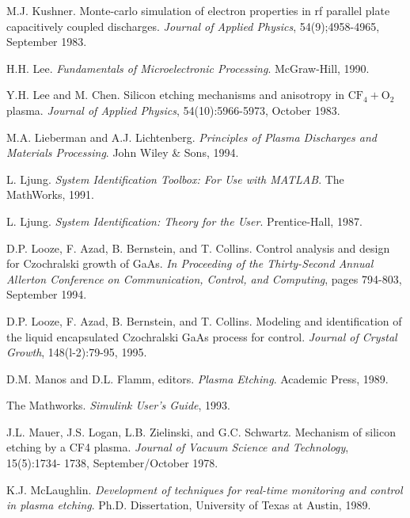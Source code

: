 \begin{thebibliography}{100}
	 M.J. Kushner. Monte-carlo simulation of electron properties in rf parallel plate capacitively coupled discharges. \emph{Journal of Applied Physics}, 54(9);4958-4965, September 1983.
	
	 H.H. Lee. \emph{Fundamentals of Microelectronic Processing}. McGraw-Hill, 1990.
	
	 Y.H. Lee and M. Chen. Silicon etching mechanisms and anisotropy in $\text{CF}_{4}+\text{O}_{2}$ plasma. \emph{Journal of Applied Physics}, 54(10):5966-5973, October 1983.

	
	 M.A. Lieberman and A.J. Lichtenberg. \emph{Principles of Plasma Discharges and Materials Processing}. John Wiley \& Sons, 1994.
	
	 L. Ljung. \emph{System Identification Toolbox: For Use with MATLAB}. The MathWorks, 1991.
	
	 L. Ljung. \emph{System Identification: Theory for the User}. Prentice-Hall, 1987.
	
	 D.P. Looze, F. Azad, B. Bernstein, and T. Collins. Control analysis and design for Czochralski growth of GaAs. \emph{In Proceeding of the Thirty-Second Annual Allerton Conference on Communication, Control, and Computing}, pages 794-803, September 1994.
	
	  D.P. Looze, F. Azad, B. Bernstein, and T. Collins. Modeling and identification of the liquid encapsulated Czochralski GaAs process for control. \emph{Journal of Crystal Growth}, 148(l-2):79-95, 1995.
	
	 D.M. Manos and D.L. Flamm, editors. \emph{Plasma Etching}. Academic Press, 1989.
	
	 The Mathworks. \emph{Simulink User’s Guide}, 1993.
	
	 J.L. Mauer, J.S. Logan, L.B. Zielinski, and G.C. Schwartz. Mechanism of silicon etching by a CF4 plasma. \emph{Journal of Vacuum Science and Technology}, 15(5):1734- 1738, September/October 1978.

	
	 K.J. McLaughlin. \emph{Development of techniques for real-time monitoring and control in plasma etching}. Ph.D. Dissertation, University of Texas at Austin, 1989.
	

\end{thebibliography}
